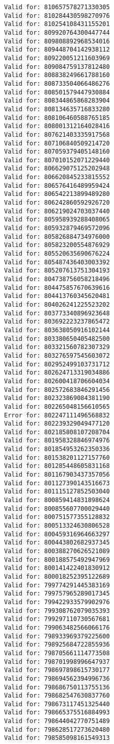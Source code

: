 \documentclass[11pt]{article}
\begin{document}
\begin{Verbatim}[commandchars=\\\{\}]
Valid for: 810657578271330305
Valid for: 810284430598270976
Valid for: 810254108431155201
Valid for: 809920764300447744
Valid for: 809808892968534016
Valid for: 809448704142938112
Valid for: 809220051211603969
Valid for: 809084759137812480
Valid for: 808838249661788160
Valid for: 808733504066486276
Valid for: 808501579447930884
Valid for: 808344865868283904
Valid for: 808134635716833280
Valid for: 808106460588765185
Valid for: 808001312164028416
Valid for: 807621403335917568
Valid for: 807106840509214720
Valid for: 807059379405148160
Valid for: 807010152071229440
Valid for: 806629075125202948
Valid for: 806620845233815552
Valid for: 806576416489959424
Valid for: 806542213899489280
Valid for: 806242860592926720
Valid for: 806219024703037440
Valid for: 805958939288408065
Valid for: 805932879469572096
Valid for: 805826884734976000
Valid for: 805823200554876929
Valid for: 805520635690676224
Valid for: 805487436403003392
Valid for: 805207613751304193
Valid for: 804738756058218496
Valid for: 804475857670639616
Valid for: 804413760345620481
Valid for: 804026241225523202
Valid for: 803773340896923648
Valid for: 803692223237865472
Valid for: 803638050916102144
Valid for: 803380650405482500
Valid for: 803321560782307329
Valid for: 803276597545603072
Valid for: 802952499103731712
Valid for: 802624713319034886
Valid for: 802600418706604034
Valid for: 802572683846291456
Valid for: 802323869084381190
Valid for: 802265048156610565
Error for: 802247111496568832
Valid for: 802239329049477120
Valid for: 802185808107208704
Valid for: 801958328846974976
Valid for: 801854953262350336
Valid for: 801538201127157760
Valid for: 801285448605831168
Valid for: 801167903437357056
Valid for: 801127390143516673
Valid for: 801115127852503040
Valid for: 800859414831898624
Valid for: 800855607700029440
Valid for: 800751577355128832
Valid for: 800513324630806528
Valid for: 800459316964663297
Valid for: 800443802682937345
Valid for: 800388270626521089
Valid for: 800188575492947969
Valid for: 800141422401830912
Valid for: 800018252395122689
Valid for: 799774291445383169
Valid for: 799757965289017345
Valid for: 799422933579902976
Valid for: 799308762079035393
Valid for: 799297110730567681
Valid for: 799063482566066176
Valid for: 798933969379225600
Valid for: 798925684722855936
Valid for: 798705661114773508
Valid for: 798701998996647937
Valid for: 798697898615730177
Valid for: 798694562394996736
Valid for: 798686750113755136
Valid for: 798682547630837760
Valid for: 798673117451325440
Valid for: 798665375516884993
Valid for: 798644042770751489
Valid for: 798628517273620480
Valid for: 798585098161549313

\end{Verbatim}
\end{document}
